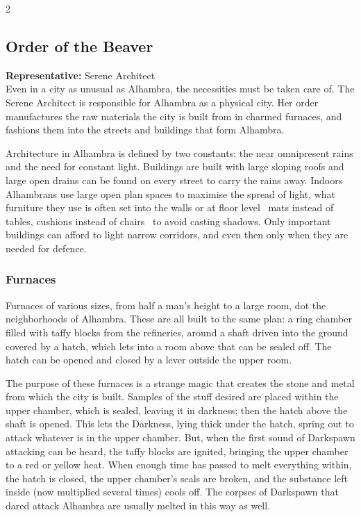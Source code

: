 \begin{multicols}{2}
\subsection*{Order of the Beaver}

\textbf{Representative:} Serene Architect\\

\noindent Even in a city as unusual as Alhambra, the necessities must be taken care of. The Serene Architect is responsible for Alhambra as a physical city. Her order manufactures the raw materials the city is built from in charmed furnaces, and fashions them into the streets and buildings that form Alhambra. 

Architecture in Alhambra is defined by two constants; the near omnipresent rains and the need for constant light. Buildings are built with large sloping roofs and large open drains can be found on every street to carry the rains away. Indoors Alhambrans use large open plan spaces to maximise the spread of light, what furniture they use is often set into the walls or at floor level \textendash\, mats instead of tables, cushions instead of chairs \textendash\, to avoid casting shadows. Only important buildings can afford to light narrow corridors, and even then only when they are needed for defence. 

\subsubsection*{Furnaces}
Furnaces of various sizes, from half a man's height to a large room, dot the neighborhoods of Alhambra. These are all built to the same plan: a ring chamber filled with taffy blocks from the refineries, around a shaft driven into the ground covered by a hatch, which lets into a room above that can be sealed off. The hatch can be opened and closed by a lever outside the upper room.

The purpose of these furnaces is a strange magic that creates the stone and metal from which the city is built. Samples of the stuff desired are placed within the upper chamber, which is sealed, leaving it in darkness; then the hatch above the shaft is opened. This lets the Darkness, lying thick under the hatch, spring out to attack whatever is in the upper chamber. But, when the first sound of Darkspawn attacking can be heard, the taffy blocks are ignited, bringing the upper chamber to a red or yellow heat. When enough time has passed to melt everything within, the hatch is closed, the upper chamber's seals are broken, and the substance left inside (now multiplied several times) cools off. The corpses of Darkspawn that dared attack Alhambra are usually melted in this way as well. 


\end{multicols}
